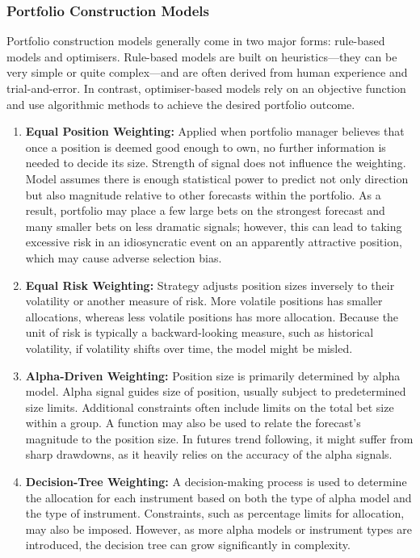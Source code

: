 \subsubsection{Portfolio Construction Models}

Portfolio construction models generally come in two major forms: rule-based models and optimisers. Rule-based models are built on heuristics—they can be very simple or quite complex—and are often derived from human experience and trial-and-error. In contrast, optimiser-based models rely on an objective function and use algorithmic methods to achieve the desired portfolio outcome.

\begin{definition} 
\begin{enumerate}[label=\roman*.]
\setlength{\itemsep}{0pt}
\item \textbf{Equal Position Weighting:} Applied when portfolio manager believes that once a position is deemed good enough to own, no further information is needed to decide its size. Strength of signal does not influence the weighting. Model assumes there is enough statistical power to predict not only direction but also magnitude relative to other forecasts within the portfolio. As a result, portfolio may place a few large bets on the strongest forecast and many smaller bets on less dramatic signals; however, this can lead to taking excessive risk in an idiosyncratic event on an apparently attractive position, which may cause adverse selection bias.
\item \textbf{Equal Risk Weighting:} Strategy adjusts position sizes inversely to their volatility or another measure of risk. More volatile positions has smaller allocations, whereas less volatile positions has more allocation. Because the unit of risk is typically a backward-looking measure, such as historical volatility, if volatility shifts over time, the model might be misled.
\item \textbf{Alpha-Driven Weighting:} Position size is primarily determined by alpha model. Alpha signal guides size of position, usually subject to predetermined size limits. Additional constraints often include limits on the total bet size within a group. A function may also be used to relate the forecast's magnitude to the position size. In futures trend following, it might suffer from sharp drawdowns, as it heavily relies on the accuracy of the alpha signals.
\item \textbf{Decision-Tree Weighting:} A decision-making process is used to determine the allocation for each instrument based on both the type of alpha model and the type of instrument. Constraints, such as percentage limits for allocation, may also be imposed. However, as more alpha models or instrument types are introduced, the decision tree can grow significantly in complexity.
\end{enumerate}

\end{definition}


